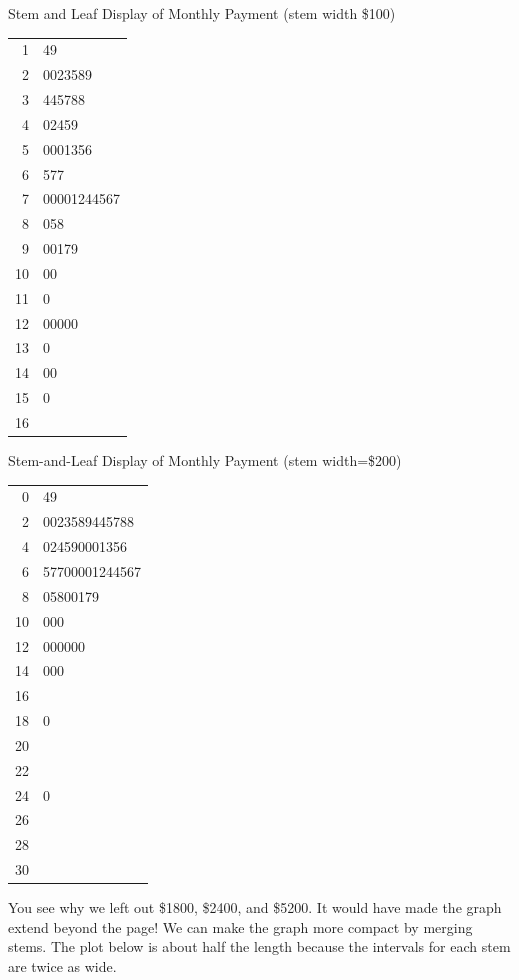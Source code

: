 \documentclass[11pt, chapterprefix=true]{scrbook}\usepackage[]{graphicx}\usepackage[]{color}
\begin{document}
\begin{minipage}[ht]{7.5cm}

Stem and Leaf Display of Monthly Payment (stem width \$100)

\begin{tabular}{@{} r|l @{}} \hline
1 & 49 \\
2 & 0023589 \\
3 & 445788 \\
4 & 02459 \\
5 & 0001356 \\
6 & 577 \\
7 & 00001244567 \\
8 & 058 \\
9 & 00179 \\
10& 00 \\
11& 0 \\
12& 00000 \\
13& 0 \\
14& 00 \\
15& 0 \\
16& \\ \hline
\end{tabular}

\end{minipage}
\begin{minipage}[ht]{7.5cm}

Stem-and-Leaf Display of Monthly Payment (stem width=\$200)

\begin{tabular}{@{} r|l @{}} \hline
0 & 49 \\
2 & 0023589445788 \\
4 & 024590001356 \\
6 & 57700001244567 \\
8 & 05800179 \\
10 & 000 \\
12 & 000000 \\
14 & 000 \\
16 &  \\
18& 0 \\
20&  \\
22&  \\
24& 0 \\
26&  \\
28&  \\
30& \\ \hline
\end{tabular}
\end{minipage}

You see why we left out \$1800, \$2400, and \$5200. It would have made the graph extend beyond the page!  We can make the graph more compact by merging stems. The plot below is about half the length because the intervals for each stem are twice as wide.
\end{document}
